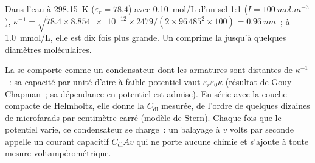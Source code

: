\begin{example}\label{ex:b3:electrode-kinetics:debye}
Dans l'eau à \qty{298.15}{K} ($\varepsilon_r = 78.4$) avec
\qty{0.10}{mol/L} d'un sel 1:1 ($I = \qty{100}{mol.m^{-3}}$),
$\kappa^{-1} = \sqrt{78.4 \times \num{8.854e-12} \times 2479/(2 \times 96\,485^2 \times 100)} = \qty{0.96}{nm}$~;
à \qty{1.0}{mmol/L}, elle est dix fois plus grande. Un  comprime la  jusqu'à quelques diamètres
moléculaires.
\end{example}

La  se comporte comme un condensateur dont les armatures
sont distantes de $\kappa^{-1}$~: sa capacité par unité d'aire à faible
potentiel vaut $\varepsilon_r\varepsilon_0\kappa$ (résultat de
Gouy--Chapman~; sa dépendance en potentiel est admise). En série avec la
couche compacte de Helmholtz, elle donne la $C_{\mathrm{dl}}$ mesurée, de
l'ordre de quelques dizaines de microfarads par centimètre carré (modèle
de Stern). Chaque fois que le potentiel varie, ce condensateur se
charge~: un balayage à $v$ volts par seconde appelle un courant capacitif
$C_{\mathrm{dl}}Av$ qui ne porte aucune chimie et s'ajoute à toute
mesure voltampérométrique.

